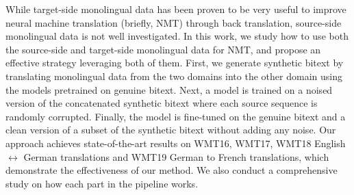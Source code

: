 While target-side monolingual data has been proven to be very useful to improve neural machine translation (briefly, NMT) through back translation, source-side monolingual data is not well investigated. In this work, we study how to use both the source-side and target-side monolingual data for NMT, and propose an effective strategy leveraging both of them. First, we generate synthetic bitext by translating monolingual data from the two domains into the other domain using the models pretrained on genuine bitext. Next, a model is trained on a noised version of the concatenated synthetic bitext where each source sequence is randomly corrupted. Finally, the model is fine-tuned on the genuine bitext and a clean version of a subset of the synthetic bitext without adding any noise. Our approach achieves state-of-the-art results on WMT16, WMT17, WMT18 English $\leftrightarrow$ German translations and WMT19 German to French translations, which demonstrate the effectiveness of our method. We also conduct a comprehensive study on how each part in the pipeline works.